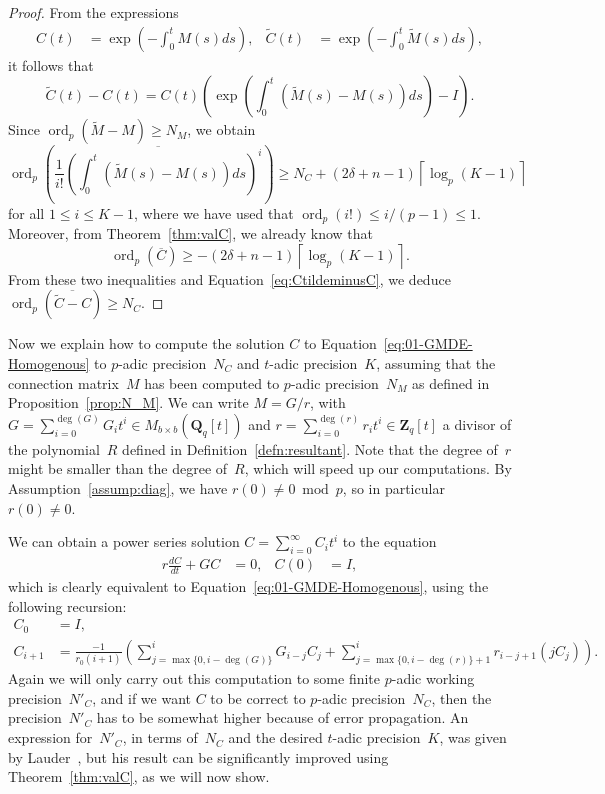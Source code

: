 \documentclass[a4paper,11pt]{article}
\numberwithin{equation}{section}
\providecommand{\ceil}[1]{\left\lceil#1\right\rceil}   %
\newcommand{\ZZ}{\mathbf{Z}} %
\newcommand{\QQ}{\mathbf{Q}} %
\DeclareMathOperator{\ord}{ord}          %
\theoremstyle{definition}
\begin{document}
\begin{proof}
From the expressions
\begin{align*}
C(t)&=\exp\left(- \int_{0}^t M(s) ds\right), &
\tilde{C}(t)&=\exp\left(-\int_{0}^t \tilde{M}(s) ds\right),
\end{align*}
it follows that
\begin{equation} \label{eq:CtildeminusC}
\tilde{C}(t) - C(t) = C(t) \left( \exp \left( \int_{0}^t \left( \tilde{M}(s)-M(s) \right) ds \right)- I \right).
\end{equation}
Since $\ord_p(\tilde{M}-M) \geq N_M$, we obtain
\begin{equation*}
\ord_p \left( \overline{\frac{1}{i!} \left(\int_{0}^t \left( \tilde{M}(s)-M(s) \right) ds \right)^i } \right) \geq 
N_C + (2 \delta + n-1) \ceil{\log_p(K-1)}
\end{equation*}
for all $1 \leq i \leq K-1$, where we have used that 
$\ord_p(i!) \leq i/(p-1) \leq 1$. Moreover, from 
Theorem~\ref{thm:valC}, we already know that 
\[
\ord_p(\overline{C}) \geq -(2 \delta + n-1) \ceil{\log_p(K-1)}.
\] 
From these two inequalities and Equation~\eqref{eq:CtildeminusC}, we 
deduce $\ord_p(\overline{\tilde{C}-C}) \geq N_C$. 
\end{proof}

Now we explain how to compute the solution $C$ to 
Equation~\eqref{eq:01-GMDE-Homogenous} to $p$-adic precision~$N_C$ and 
$t$-adic precision~$K$, assuming that the connection matrix~$M$ has been 
computed to $p$-adic precision~$N_M$ as defined in Proposition~\ref{prop:N_M}. 
We can write $M = G/r$, with 
$G = \sum_{i=0}^{\deg(G)} G_i t^i \in M_{b \times b}(\QQ_q[t])$ 
and $r = \sum_{i=0}^{\deg(r)} r_i t^i \in \ZZ_q[t]$ a divisor of the 
polynomial~$R$ defined in Definition~\ref{defn:resultant}. 
Note that the degree of~$r$ might be smaller than the degree 
of~$R$, which will speed up our computations. By Assumption~\ref{assump:diag}, 
we have $r(0) \neq 0 \bmod{p}$, so in particular $r(0) \neq 0$.  

We can obtain a power series solution $C = \sum_{i=0}^{\infty} C_i t^i$ to
the equation
\begin{align*}
r \frac{dC}{dt} + G C &= 0, &C(0)& = I,
\end{align*}
which is clearly equivalent to 
Equation~\eqref{eq:01-GMDE-Homogenous}, using the following recursion:  
\begin{align} \label{eq:recursiondifeq}
C_0 &= I, \nonumber \\
C_{i+1} &= \frac{-1}{r_0 (i+1)} \left(
    \sum_{j=\max{\{0,i-\deg(G)\}}}^i G_{i-j} C_j + 
    \sum_{j=\max{\{0,i-\deg(r)\}}+1}^i r_{i-j+1} (j C_j) \right).
\end{align}
Again we will only carry out this computation to some finite $p$-adic 
working precision~$N'_C$, and if we want $C$ to be correct to $p$-adic 
precision~$N_C$, then the precision~$N'_C$ has to be somewhat higher 
because of error propagation. An expression for~$N'_C$, in terms of~$N_C$ 
and the desired $t$-adic precision~$K$, was given by 
Lauder~\citep[Theorem~5.1]{Lauder2006}, but his result can be
significantly improved using Theorem~\ref{thm:valC}, as we will now show. 
\end{document}
